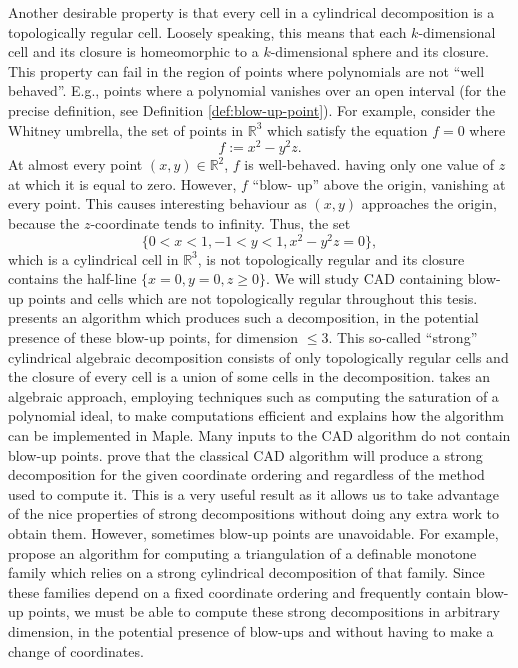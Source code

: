 \documentclass[
]{book}
\theoremstyle{definition}
\theoremstyle{definition}
\theoremstyle{definition}
\theoremstyle{definition}
\theoremstyle{remark}
\begin{document}
Another desirable property is that every cell in a cylindrical decomposition is a topologically regular cell. Loosely speaking, this means that each \(k\)-dimensional cell and its closure is homeomorphic to a \(k\)-dimensional sphere and its closure.
This property can fail in the region of points where polynomials are not ``well behaved''.
E.g., points where a polynomial vanishes over an open interval (for the precise definition, see Definition
\ref{def:blow-up-point}).
For example, consider the Whitney umbrella, the set of points in \(\mathbb{R}^3\) which satisfy the equation \(f = 0\) where
\[
f := x^2 - y^2 z.
\]
At almost every point \((x,y) \in \mathbb{R}^2\), \(f\) is well-behaved. having only one value of \(z\) at which it is equal to zero. However, \(f\) ``blow- up'' above the origin, vanishing at every point. This causes interesting behaviour as \((x,y)\) approaches the origin, because the \(z\)-coordinate tends to infinity. Thus, the set
\begin{equation}
\{ 0 < x < 1, -1 < y < 1, x^2 - y^2 z = 0 \},
\label{eq:basic-semialgebraic}
\end{equation}
which is a cylindrical cell in \(\mathbb{R}^3\), is not topologically regular and its closure contains the half-line \(\{ x = 0, y = 0, z \ge 0 \}\).
We will study CAD containing blow-up points and cells which are not topologically regular throughout this tesis.
\citet{lazard10} presents an algorithm which produces such a decomposition, in the potential presence of these blow-up points, for dimension \(\le 3\). This so-called ``strong'' cylindrical algebraic decomposition consists of only topologically regular cells and the closure of every cell is a union of some cells in the decomposition. \citet{lazard10} takes an algebraic approach, employing techniques such as computing the saturation of a polynomial ideal, to make computations efficient and explains how the algorithm can be implemented in Maple.
Many inputs to the CAD algorithm do not contain blow-up points. \citet{jhd20} prove that the classical CAD algorithm will produce a strong decomposition for the given coordinate ordering and regardless of the method used to compute it. This is a very useful result as it allows us to take advantage of the nice properties of strong decompositions without doing any extra work to obtain them.
However, sometimes blow-up points are unavoidable. For example, \citet{bgv15} propose an algorithm for computing a triangulation of a definable monotone family which relies on a strong cylindrical decomposition of that family. Since these families depend on a fixed coordinate ordering and frequently contain blow-up points, we must be able to compute these strong decompositions in arbitrary dimension, in the potential presence of blow-ups and without having to make a change of coordinates.
\end{document}
